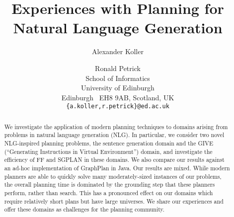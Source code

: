 \documentclass[letterpaper]{article}
\title{Experiences with Planning for Natural Language Generation}
\author{Alexander Koller \and Ronald Petrick \\
School of Informatics \\
University of Edinburgh \\
Edinburgh \ EH8 9AB, Scotland, UK \\
\texttt{\{a.koller,r.petrick\}@ed.ac.uk}}
\begin{document}
\maketitle


\begin{abstract}
We investigate the application of modern planning techniques to domains
arising from problems in natural language generation (NLG). In particular,
we consider two novel NLG-inspired planning problems, the sentence
generation domain and the GIVE (``Generating Instructions in Virtual
Environment'') domain, and investigate the efficiency of FF and SGPLAN in
these domains. We also compare our results against an ad-hoc implementation
of GraphPlan in Java. Our results are mixed. While modern planners are able
to quickly solve many moderately-sized instances of our problems, the
overall planning time is dominated by the grounding step that these
planners perform, rather than search. This has a pronounced effect on our
domains which require relatively short plans but have large universes. We
share our experiences and offer these domains as challenges for the
planning community.
\end{abstract}











\end{document}
